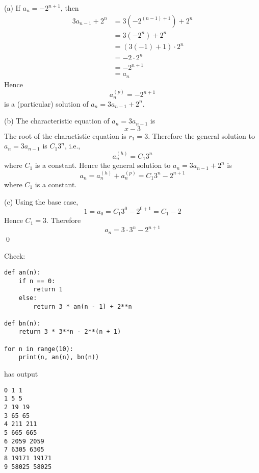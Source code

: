 
(a)
If $a_n = -2^{n+1}$, then
\begin{align*}
3a_{n-1} + 2^n
&= 3(-2^{(n-1)+1}) + 2^n \\
&= 3(-2^n) + 2^n \\
&= (3(-1) + 1) \cdot 2^n \\
&= -2 \cdot 2^n \\
&= -2^{n + 1} \\
&= a_n
\end{align*}
Hence
\[
a_n^{(p)} = -2^{n+1}
\]
is a (particular) solution of $a_n = 3a_{n - 1} + 2^n$.


(b)
The characteristic equation of
$a_n = 3a_{n - 1}$
is
\[
x - 3
\]
The root of the charactistic equation is $r_1 = 3$.
Therefore the general solution to
$a_n = 3a_{n - 1}$ is $C_1 3^n$, i.e.,
\[
a_n^{(h)} = C_1 3^n
\]
where $C_1$ is a constant.
Hence the general solution to
$a_n = 3a_{n - 1} + 2^n$ is
\[
a_n = a_n^{(h)} + a_n^{(p)} = C_1 3^n -2^{n+1}
\]
where $C_1$ is a constant.

(c)
Using the base case,
\[
1 = a_0 = C_1 3^0 -2^{0+1} = C_1 - 2
\]
Hence $C_1 = 3$.
Therefore
\[
a_n = 3 \cdot 3^n -2^{n+1}
\]
\qed

Check:
\begin{Verbatim}[frame=single,fontsize=\small]
def an(n):
    if n == 0:
        return 1
    else:
        return 3 * an(n - 1) + 2**n

def bn(n):
    return 3 * 3**n - 2**(n + 1)

for n in range(10):
    print(n, an(n), bn(n))     
\end{Verbatim}
has output
\begin{Verbatim}[frame=single,fontsize=\small]
0 1 1
1 5 5
2 19 19
3 65 65
4 211 211
5 665 665
6 2059 2059
7 6305 6305
8 19171 19171
9 58025 58025
\end{Verbatim}
